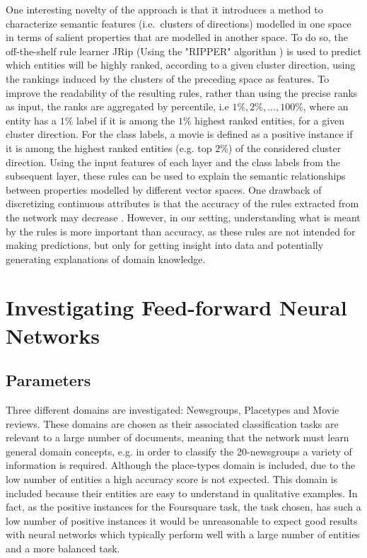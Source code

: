 One interesting  novelty of the approach is that  it introduces a method to characterize semantic features (i.e.\ clusters of directions)  modelled in one space  in terms of salient properties that are modelled in another space. To do so, the off-the-shelf rule learner JRip (Using the "RIPPER" algorithm \cite{Cohen1995})  is used to predict which entities will be highly ranked, according to a given cluster direction, using the rankings induced by the clusters of the preceding space   as features. To improve the readability of the resulting rules, rather than using the precise ranks as input, the ranks are aggregated by percentile, i.e $1\%, 2\%, ..., 100\%$, where an entity has a $1\%$ label if it is among the $1\%$ highest ranked entities, for a given cluster direction. For the class labels,  a movie is defined as a positive instance if it is among the highest ranked entities (e.g. top 2\%) of the considered cluster direction. Using the input features of each layer and the class labels  from the subsequent layer, these rules can be used to explain the semantic relationships between properties modelled by different vector spaces. One drawback of discretizing continuous attributes is that the accuracy of the rules extracted from the network may decrease \cite{Setiono2008a}.  However, in our setting, understanding what is meant by the rules is more important than accuracy, as  these rules are not intended for making predictions, but only for getting insight into data and potentially  generating explanations of domain knowledge.


\section{Investigating Feed-forward Neural Networks}\label{ch5:results}

\subsection{Parameters}

Three different domains are investigated: Newsgroups, Placetypes and Movie reviews. These domains are chosen as their  associated classification tasks are relevant to a large number of documents, meaning that the network must learn general domain concepts, e.g. in order to classify the 20-newsgroups a variety  of information is required. Although the place-types domain is included, due to the low number of entities a high accuracy score is not expected. This domain is included  because their entities are easy to understand in qualitative examples. In fact, as the positive instances for the Foursquare task, the task chosen, has such a low number of positive instances it would be unreasonable to expect good results with neural networks which typically perform well with a large number of entities and a more balanced task.

